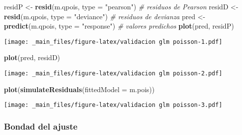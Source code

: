 \documentclass[
]{book}
\newenvironment{Shaded}{\begin{snugshade}}{\end{snugshade}}
\newcommand{\CommentTok}[1]{\textcolor[rgb]{0.56,0.35,0.01}{\textit{#1}}}
\newcommand{\DataTypeTok}[1]{\textcolor[rgb]{0.13,0.29,0.53}{#1}}
\newcommand{\DecValTok}[1]{\textcolor[rgb]{0.00,0.00,0.81}{#1}}
\newcommand{\KeywordTok}[1]{\textcolor[rgb]{0.13,0.29,0.53}{\textbf{#1}}}
\newcommand{\NormalTok}[1]{#1}
\newcommand{\OperatorTok}[1]{\textcolor[rgb]{0.81,0.36,0.00}{\textbf{#1}}}
\newcommand{\StringTok}[1]{\textcolor[rgb]{0.31,0.60,0.02}{#1}}
\begin{document}
\begin{Shaded}
\begin{Highlighting}[]
\NormalTok{residP <-}\StringTok{ }\KeywordTok{resid}\NormalTok{(m.qpois, }\DataTypeTok{type =} \StringTok{"pearson"}\NormalTok{)  }\CommentTok{# residuos de Pearson }
\NormalTok{residD <-}\StringTok{ }\KeywordTok{resid}\NormalTok{(m.qpois, }\DataTypeTok{type =} \StringTok{"deviance"}\NormalTok{) }\CommentTok{# residuos de devianza }
\NormalTok{pred <-}\StringTok{ }\KeywordTok{predict}\NormalTok{(m.qpois, }\DataTypeTok{type =} \StringTok{"response"}\NormalTok{) }\CommentTok{# valores predichos }
\KeywordTok{plot}\NormalTok{(pred, residP) }
\end{Highlighting}
\end{Shaded}

\texttt{[image: \_main\_files/figure-latex/validacion glm poisson-1.pdf]}

\begin{Shaded}
\begin{Highlighting}[]
\KeywordTok{plot}\NormalTok{(pred, residD)}
\end{Highlighting}
\end{Shaded}

\texttt{[image: \_main\_files/figure-latex/validacion glm poisson-2.pdf]}

\begin{Shaded}
\begin{Highlighting}[]
\KeywordTok{plot}\NormalTok{(}\KeywordTok{simulateResiduals}\NormalTok{(}\DataTypeTok{fittedModel =}\NormalTok{ m.pois))}
\end{Highlighting}
\end{Shaded}

\texttt{[image: \_main\_files/figure-latex/validacion glm poisson-3.pdf]}

\hypertarget{bondad-del-ajuste-1}{%
\subsubsection{Bondad del ajuste}\label{bondad-del-ajuste-1}}

\begin{Shaded}
\end{Shaded}
\end{document}
